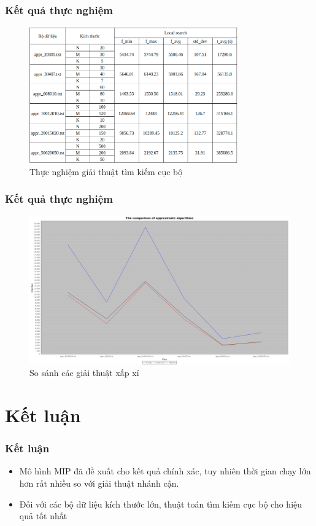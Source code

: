 \documentclass{beamer}
\begin{document}
	\begin{frame}
		\frametitle{Kết quả thực nghiệm}
		\begin{figure}
			\centering
			\caption{Thực nghiệm giải thuật tìm kiếm cục bộ}
			\includegraphics[width=0.8\textwidth]{images/localsearch.png}
		\end{figure}
	\end{frame}

	\begin{frame}
		\frametitle{Kết quả thực nghiệm}
		\begin{figure}
			\centering
			\caption{So sánh các giải thuật xấp xỉ}
			\includegraphics[width=\textwidth]{../result/image/comparison.png}
		\end{figure}
	\end{frame}

	
	\section{Kết luận}
	
	
	\begin{frame}
		\frametitle{Kết luận}
		\begin{itemize}
			\item Mô hình MIP đã đề xuất cho kết quả chính xác, tuy nhiên thời gian chạy lớn hơn rất nhiều so với giải thuật nhánh cận.
			\item Đối với các bộ dữ liệu kích thước lớn, thuật toán tìm kiếm cục bộ cho hiệu quả tốt nhất
		\end{itemize}
	\end{frame}
	
\end{document}
